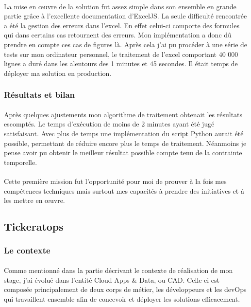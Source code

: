 \documentclass[12pt]{article}
\begin{document}
\begin {sloppypar}
\paragraph{}
La mise en œuvre de la solution fut assez simple dans son ensemble en grande partie 
grâce à l'excellente documentation d'ExcelJS. La seule difficulté rencontrée a été la gestion 
des erreurs dans l'excel. En effet celui-ci comporte des formules qui dans certains cas retournent
des erreurs. Mon implémentation a donc dû prendre en compte ces cas de figures là. Après cela j'ai pu 
procéder à une série de tests sur mon ordinateur personnel, le traitement de l'excel comportant 40 000
lignes a duré dans les alentours des 1 minutes et 45 secondes. Il était temps de déployer ma solution 
en production.
\subsubsection{Résultats et bilan}
\paragraph{}
Après quelques ajustements mon algorithme de traitement obtenait les résultats escomptés.
Le temps d'exécution de moins de 2 minutes ayant été jugé satisfaisant. 
\linebreak 
Avec plus de temps une implémentation du script Python aurait été possible, permettant de réduire encore
plus le temps de traitement. Néanmoins je pense avoir pu obtenir le meilleur résultat possible 
compte tenu de la contrainte temporelle.
\paragraph{}
Cette première mission fut l'opportunité pour moi de prouver à la fois mes compétences techniques
mais surtout mes capacités à prendre des initiatives et à les mettre en œuvre.

\newpage
\subsection{Tickeratops}
\subsubsection{Le contexte}
\paragraph{}
Comme mentionné dans la partie décrivant le contexte de réalisation de mon stage, j'ai évolué 
dans l'entité Cloud Apps \& Data, ou CAD. Celle-ci est composée principalement de deux corps 
de métier, les développeurs et les devOps qui travaillent ensemble afin de concevoir 
et déployer les solutions efficacement.

\end{sloppypar}
\end{document}
